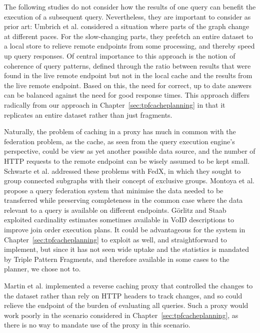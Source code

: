 The following studies do not consider how the results of one query can
benefit the execution of a subsequent query. Nevertheless, they are
important to consider as prior art:
Umbrich et al. \cite{umbrich2012hybrid} considered a situation where
parts of the graph change at different paces. For the slow-changing
parts, they prefetch an entire dataset to a local store to relieve
remote endpoints from some processing, and thereby speed up query
responses. Of central importance to this approach is the notion of
coherence of query patterns, defined through the ratio between results
that were found in the live remote endpoint but not in the local cache
and the results from the live remote endpoint. Based on this, the need
for correct, up to date answers can be balanced against the need for
good response times.  This approach differs radically from our
approach in Chapter~\ref{sec:tpfcacheplanning} in that it replicates
an entire dataset rather than just fragments.

Naturally, the problem of caching in a proxy has much in common with
the federation problem, as the cache, as seen from the query execution
engine's perspective, could be view as yet another possible data
source, and the number of HTTP requests to the remote endpoint can be
wisely assumed to be kept small. Schwarte et
al. \cite{springerlink:10.1007/978-3-642-25073-6-38} addressed these
problems with FedX, in which they sought to group connected subgraphs
with their concept of exclusive groups.  Montoya et
al. \cite{montoya2015federated} propose a query federation system that
minimise the data needed to be transferred while preserving
completeness in the common case where the data relevant to a query is
available on different endpoints. Görlitz and Staab \cite{splendid}
exploited cardinality estimates sometimes available in VoID
\cite{voidnote} descriptions to improve join order execution plans. It
could be advantageous for the system in
Chapter~\ref{sec:tpfcacheplanning} to exploit as well, and
straightforward to implement, but since it has not seen wide uptake
and the statistics is mandated by Triple Pattern Fragments, and
therefore available in some cases to the planner, we chose not to.

Martin et al. \cite{sparqlproxy} implemented a reverse caching proxy
that controlled the changes to the dataset rather than rely on HTTP
headers to track changes, and so could relieve the endpoint of the
burden of evaluating all queries. Such a proxy would work poorly in
the scenario considered in Chapter~\ref{sec:tpfcacheplanning}, as
there is no way to mandate use of the proxy in this scenario.

